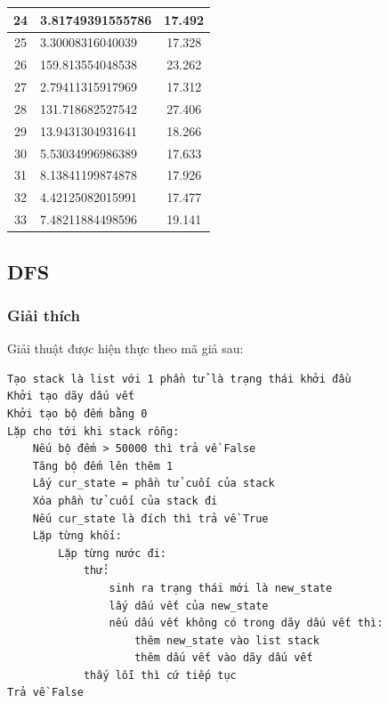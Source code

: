 \documentclass[a4paper, 11pt]{article}
\begin{document}
\begin{center}
\begin{tabular}{|c|l|c|}
		24       & 3.81749391555786  & 17.492       \\ \hline
		25       & 3.30008316040039  & 17.328       \\ \hline
		26       & 159.813554048538  & 23.262       \\ \hline
		27       & 2.79411315917969  & 17.312       \\ \hline
		28       & 131.718682527542  & 27.406       \\ \hline
		29       & 13.9431304931641  & 18.266       \\ \hline
		30       & 5.53034996986389  & 17.633       \\ \hline
		31       & 8.13841199874878  & 17.926       \\ \hline
		32       & 4.42125082015991  & 17.477       \\ \hline
		33       & 7.48211884498596  & 19.141       \\ \hline
	\end{tabular}
\end{center}
\subsection{DFS}
\subsubsection{Giải thích}
Giải thuật được hiện thực theo mã giả sau:
\begin{verbatim}
Tạo stack là list với 1 phần tử là trạng thái khởi đầu
Khởi tạo dãy dấu vết
Khởi tạo bộ đếm bằng 0
Lặp cho tới khi stack rỗng:
    Nếu bộ đếm > 50000 thì trả về False
    Tăng bộ đếm lên thêm 1
    Lấy cur_state = phần tử cuối của stack
    Xóa phần tử cuối của stack đi
    Nếu cur_state là đích thì trả về True
    Lặp từng khối:
        Lặp từng nước đi:
            thử:
                sinh ra trạng thái mới là new_state
                lấy dấu vết của new_state
                nếu dấu vết không có trong dãy dấu vết thì:
                    thêm new_state vào list stack
                    thêm dấu vết vào dãy dấu vết
            thấy lỗi thì cứ tiếp tục
Trả về False
\end{verbatim}
\end{document}
